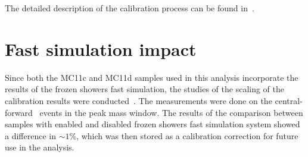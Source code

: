 The detailed description of the calibration process can be found in~\cite{lib:calib}.

\section{Fast simulation impact}

Since both the MC11c and MC11d samples used in this analysis incorporate the results of the frozen showers fast simulation, the studies of the scaling of the calibration results were conducted~\cite{lib:calib_support}. The measurements were done on the central-forward \Zee\ events in the peak mass window. The results of the comparison between samples with enabled and disabled frozen showers fast simulation system showed a difference in $\sim 1$\%, which was then stored as a calibration correction for future use in the analysis.

